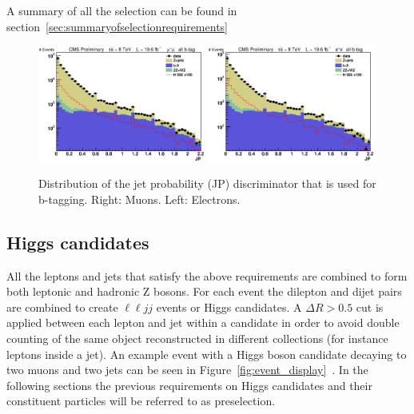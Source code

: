 A summary of all the selection can be found in section~\ref{sec:summaryofselectionrequirements}


\begin{figure}[htb]
\begin{center}
\centerline{
\includegraphics[width=0.49\textwidth]{presentation/defense/images/preselection/mu/j0jp_log.eps}
\includegraphics[width=0.49\textwidth]{presentation/defense/images/preselection/el/j0jp_log.eps}
}
\caption{
Distribution of the jet probability (JP) discriminator that is used for b-tagging.  Right: Muons. Left: Electrons.
}
\label{fig:JP}
\end{center}
\end{figure}


\subsection{Higgs candidates}
\label{sec:reco}
All the leptons and jets that satisfy the above requirements are combined to form both leptonic and hadronic Z bosons.  For each event the dilepton and dijet pairs are combined to create $\ell \ell jj$ events or Higgs candidates. A $\Delta R > 0.5$ cut is applied between each lepton and jet within a candidate in order to avoid double counting of the same object reconstructed in different collections (for instance leptons inside a jet). An example event with a Higgs boson candidate decaying to two muons and two jets can be seen in Figure~\ref{fig:event_display}~\cite{CMS-PAS-HIG-12-024}. In the following sections the previous requirements on Higgs candidates and their constituent particles will be referred to as preselection.

